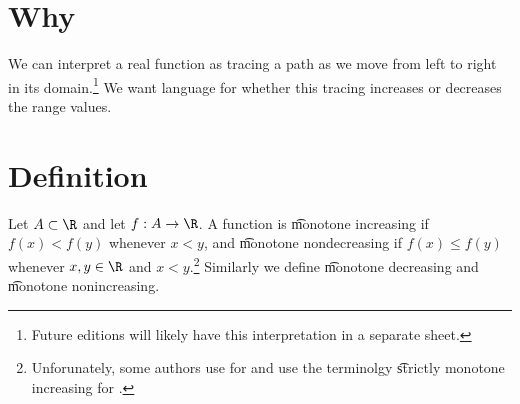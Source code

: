 

\section*{Why}

We can interpret a real function as tracing a path as we move from left to right in its domain.\footnote{Future editions will likely have this interpretation in a separate sheet.}
We want language for whether this tracing increases or decreases the range values.

\section*{Definition}

Let $A \subset \R $ and let $f: A \to \R $.
A function is \t{monotone increasing} if $f(x) < f(y)$ whenever $x < y$, and \t{monotone nondecreasing} if $f(x) \leq f(y)$ whenever $x, y \in \R $ and $x < y$.\footnote{Unforunately, some authors use 
for  and use the terminolgy \t{strictly monotone increasing} for .}
Similarly we define \t{monotone decreasing} and \t{monotone nonincreasing}.

\blankpage